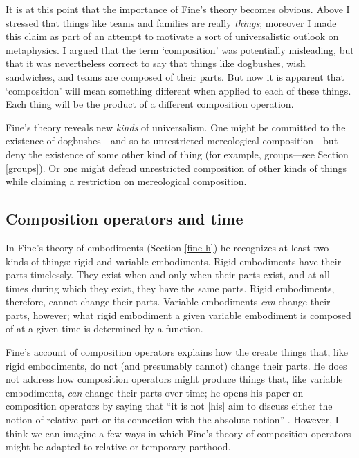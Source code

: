 \documentclass[11pt]{article}
\begin{document}
\begin{spacing}{1.5}
It is at this point that the importance of Fine's theory becomes
obvious.  Above I stressed that things like teams and families are
really {\em things}; moreover I made this claim as part of an attempt
to motivate a sort of universalistic outlook on metaphysics.  I argued
that the term `composition' was potentially misleading, but that it
was nevertheless correct to say that things like dogbushes, wish
sandwiches, and teams are composed of their parts.  But now it is
apparent that `composition' will mean something different when applied
to each of these things.  Each thing will be the product of a
different composition operation.

Fine's theory reveals new {\em kinds} of universalism.  One might be
committed to the existence of dogbushes---and so to unrestricted
mereological composition---but deny the existence of some other kind
of thing (for example, groups---see Section \ref{groups}).  Or one
might defend unrestricted composition of other kinds of things while
claiming a restriction on mereological composition.

\subsection{Composition operators and time}
\label{c-change}
In Fine's theory of embodiments (Section \ref{fine-h}) he recognizes
at least two kinds of things: rigid and variable embodiments.  Rigid
embodiments have their parts timelessly.  They exist when and only
when their parts exist, and at all times during which they exist, they
have the same parts.  Rigid embodiments, therefore, cannot change
their parts.  Variable embodiments {\em can} change their parts,
however; what rigid embodiment a given variable embodiment is composed
of at a given time is determined by a function.

Fine's account of composition operators explains how the create things
that, like rigid embodiments, do not (and presumably cannot) change
their parts.  He does not address how composition operators might
produce things that, like variable embodiments, {\em can} change their
parts over time; he opens his paper on composition operators by saying
that ``it is not [his] aim to discuss either the notion of relative
part or its connection with the absolute notion''
\citeyearpar[559]{fine2010}.  However, I think we can imagine a few
ways in which Fine's theory of composition operators might be adapted
to relative or temporary parthood.


\end{spacing}
\end{document}
